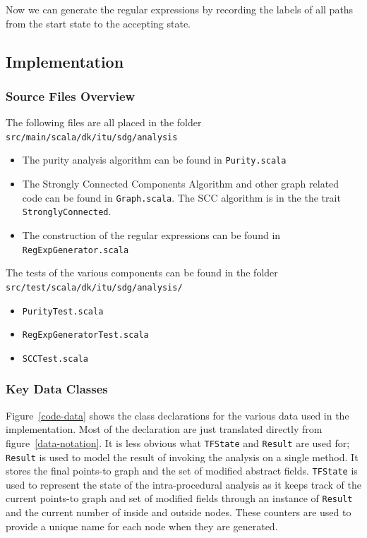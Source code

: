 \documentclass[11pt]{exam}
\begin{document}
Now we can generate the regular expressions by recording the labels of
all paths from the start state to the accepting state.

\subsection{Implementation}

\subsubsection*{Source Files Overview}

The following files are all placed in the folder
\texttt{src/main/scala/dk/itu/sdg/analysis}

\begin{itemize}
  \setlength{\itemsep}{1pt}
  \setlength{\parskip}{0pt}
  \item The purity analysis algorithm can be found in \texttt{Purity.scala}
  \item The Strongly Connected Components Algorithm and other graph related code can be found in \texttt{Graph.scala}. The SCC algorithm is in the the trait \texttt{StronglyConnected}.
  \item The construction of the regular expressions can be 
  found in \texttt{RegExpGenerator.scala}
\end{itemize}

The tests of the various components can be found in the folder
\texttt{src/test/scala/dk/itu/sdg/analysis/}

\begin{itemize}
  \setlength{\itemsep}{1pt}
  \setlength{\parskip}{0pt}
  \item \texttt{PurityTest.scala}
  \item \texttt{RegExpGeneratorTest.scala}
  \item \texttt{SCCTest.scala}
\end{itemize}

\subsubsection*{Key Data Classes}

Figure~\ref{code-data} shows the class declarations for the various
data used in the implementation. Most of the  declaration are just
translated directly from figure~\ref{data-notation}. It is less
obvious what \texttt{TFState} and \texttt{Result} are used for;
\texttt{Result} is used to model the result of invoking the analysis on a
single method. It stores the final points-to graph and the set of
modified abstract fields. \texttt{TFState}  is used to represent the
state of the intra-procedural analysis as it  keeps track of the
current points-to graph and set of modified fields through an instance
of \texttt{Result} and the current number of inside and outside
nodes. These counters are used to provide a unique name for each node
when they are generated.
\end{document}
